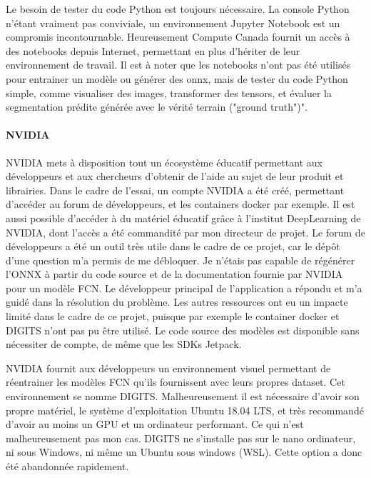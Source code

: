 \par Le besoin de tester du code Python est toujours nécessaire. La console Python n'étant vraiment pas conviviale, un environnement Jupyter Notebook est un compromis incontournable. Heureusement Compute Canada fournit un accès à des notebooks depuis Internet, permettant en plus d'hériter de leur environnement de travail. Il est à noter que les notebooks n'ont pas été utilisés pour entrainer un modèle ou générer des onnx, mais de tester du code Python simple, comme visualiser des images, transformer des tensors, et évaluer la segmentation prédite générée avec le vérité terrain ("ground truth")". 
\paragraph{NVIDIA}
\par NVIDIA mets à disposition tout un écosystème éducatif permettant aux développeurs et aux chercheurs d'obtenir de l'aide au sujet de leur produit et librairies. Dans le cadre de l'essai, un compte NVIDIA a été créé, permettant d'accéder au forum de développeurs, et les containers  docker par exemple. Il est aussi possible d'accéder à du matériel éducatif grâce à l'institut DeepLearning de NVIDIA, dont l'accès a été commandité par mon directeur de projet. Le forum de développeurs a été un outil très utile dans le cadre de ce projet, car le dépôt d'une question m'a permis de me débloquer. Je n'étais pas capable de régénérer l'ONNX à partir du code source et de la documentation fournie par NVIDIA pour un modèle FCN. Le développeur principal de l'application a répondu et m'a guidé dans la résolution du problème. Les autres ressources ont eu un impacte limité dans le cadre de ce projet, puisque par exemple le container docker et DIGITS n'ont pas pu être utilisé. Le code source des modèles est disponible sans nécessiter de compte, de même que les SDKs Jetpack.
\par NVIDIA fournit aux développeurs un environnement visuel permettant de réentrainer les modèles FCN qu'ils fournissent avec leurs propres dataset. Cet environnement se nomme DIGITS. Malheureusement il est nécessaire d'avoir son propre matériel, le système d'exploitation Ubuntu 18.04 LTS, et très recommandé d'avoir au moins un GPU et un ordinateur performant. Ce qui n'est malheureusement pas mon cas. DIGITS ne s'installe pas sur le nano ordinateur, ni sous Windows, ni même un Ubuntu sous windows (WSL). Cette option a donc été abandonnée rapidement. 
